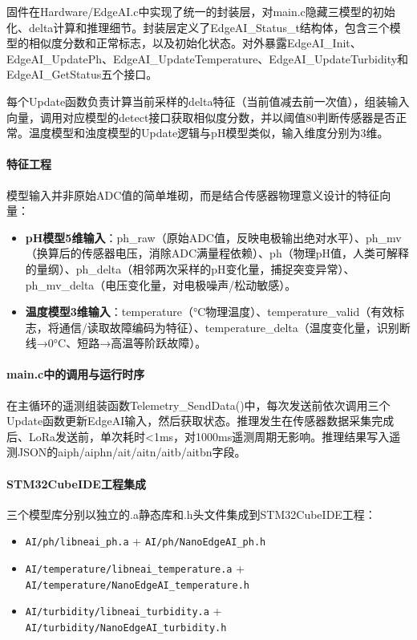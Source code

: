 \documentclass[12pt,a4paper]{ctexart}
\begin{document}
固件在Hardware/EdgeAI.c中实现了统一的封装层，对main.c隐藏三模型的初始化、delta计算和推理细节。封装层定义了EdgeAI\_Status\_t结构体，包含三个模型的相似度分数和正常标志，以及初始化状态。对外暴露EdgeAI\_Init、EdgeAI\_UpdatePh、EdgeAI\_UpdateTemperature、EdgeAI\_UpdateTurbidity和EdgeAI\_GetStatus五个接口。

每个Update函数负责计算当前采样的delta特征（当前值减去前一次值），组装输入向量，调用对应模型的detect接口获取相似度分数，并以阈值80判断传感器是否正常。温度模型和浊度模型的Update逻辑与pH模型类似，输入维度分别为3维。

\paragraph{特征工程}

模型输入并非原始ADC值的简单堆砌，而是结合传感器物理意义设计的特征向量：

\begin{itemize}
    \item \textbf{pH模型5维输入}：ph\_raw（原始ADC值，反映电极输出绝对水平）、ph\_mv（换算后的传感器电压，消除ADC满量程依赖）、ph（物理pH值，人类可解释的量纲）、ph\_delta（相邻两次采样的pH变化量，捕捉突变异常）、ph\_mv\_delta（电压变化量，对电极噪声/松动敏感）。
    \item \textbf{温度模型3维输入}：temperature（°C物理温度）、temperature\_valid（有效标志，将通信/读取故障编码为特征）、temperature\_delta（温度变化量，识别断线→0°C、短路→高温等阶跃故障）。
\end{itemize}

\paragraph{main.c中的调用与运行时序}

在主循环的遥测组装函数Telemetry\_SendData()中，每次发送前依次调用三个Update函数更新EdgeAI输入，然后获取状态。推理发生在传感器数据采集完成后、LoRa发送前，单次耗时<1ms，对1000ms遥测周期无影响。推理结果写入遥测JSON的aiph/aiphn/ait/aitn/aitb/aitbn字段。

\paragraph{STM32CubeIDE工程集成}

三个模型库分别以独立的.a静态库和.h头文件集成到STM32CubeIDE工程：

\begin{itemize}
    \item \texttt{AI/ph/libneai\_ph.a} + \texttt{AI/ph/NanoEdgeAI\_ph.h}
    \item \texttt{AI/temperature/libneai\_temperature.a} + \texttt{AI/temperature/NanoEdgeAI\_temperature.h}
    \item \texttt{AI/turbidity/libneai\_turbidity.a} + \texttt{AI/turbidity/NanoEdgeAI\_turbidity.h}
\end{itemize}
\end{document}
